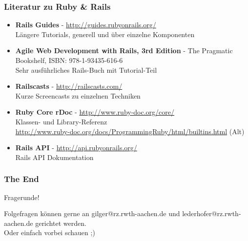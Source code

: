 \begin{frame}
  \frametitle{Literatur zu Ruby \& Rails}
  \begin{itemize}
    \item {\bf Rails Guides} - \url{http://guides.rubyonrails.org/} \\ Längere Tutorials, generell und über einzelne Komponenten
    \item {\bf Agile Web Development with Rails, 3rd Edition} - The Pragmatic Bookshelf, ISBN: 978-1-93435-616-6 \\ Sehr ausführliches Rails-Buch mit Tutorial-Teil
    \item {\bf Railscasts} - \url{http://railscasts.com/} \\ Kurze Screencasts zu einzelnen Techniken
    \item {\bf Ruby Core rDoc} - \url{http://www.ruby-doc.org/core/} \\ Klassen- und Library-Referenz \\ \url{http://www.ruby-doc.org/docs/ProgrammingRuby/html/builtins.html} (Alt)
    \item {\bf Rails API} - \url{http://api.rubyonrails.org/} \\ Rails API Dokumentation
  \end{itemize}
\end{frame}

\begin{frame}
  \frametitle{The End}
  \begin{center}
    \Huge Fragerunde!
    \vspace{1.5cm}

    \small Folgefragen können gerne an gilger@rz.rwth-aachen.de und lederhofer@rz.rwth-aachen.de gerichtet werden. \\
    Oder einfach vorbei schauen ;)
  \end{center}
\end{frame}


